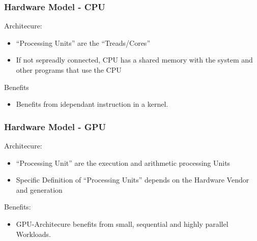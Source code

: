 \documentclass{beamer}
\begin{document}
\begin{frame}
    \frametitle{Hardware Model - CPU}
    Architecure:
    \begin{itemize}
        \item ``Processing Units'' are the ``Treads/Cores''
        \item If not sepreadly connected, CPU has a shared memory with the system and other programs that use the CPU
    \end{itemize}
    Benefits
    \begin{itemize}
        \item Benefits from idependant instruction in a kernel.
    \end{itemize}

\end{frame}
\begin{frame}
    \frametitle{Hardware Model - GPU}
    Architecure:
    \begin{itemize}
     \item ``Processing Unit'' are the execution and arithmetic processing Units
     \item Specific Definition of ``Processing Units'' depends on the Hardware Vendor and generation
    \end{itemize}
    Benefits:
    \begin{itemize}
     \item GPU-Architecure benefits from small, sequential and highly parallel Workloads.
    \end{itemize}
\end{frame}
\end{document}
